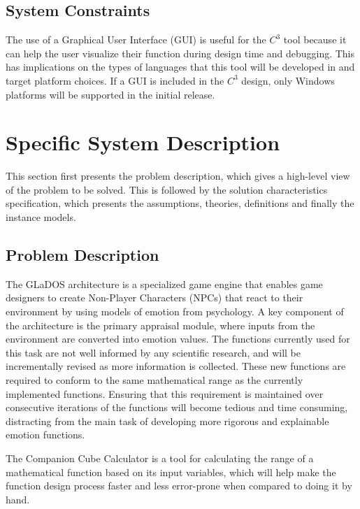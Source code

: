 \documentclass[12pt]{article}
\newcommand{\progname}{Companion Cube Calculator} %
\newcommand{\prognameAbbrv}{$C^{3}$}
\begin{document}
\subsection{System Constraints}
The use of a Graphical User Interface (GUI) is useful for the \prognameAbbrv{} 
tool because it can help the user visualize their function during design time 
and debugging. This has implications on the types of languages that this tool 
will be developed in and target platform choices. If a GUI is included in the 
\prognameAbbrv{} design, only Windows platforms will be supported in the 
initial release.

\section{Specific System Description}
\label{specific}
This section first presents the problem description, which gives a high-level
view of the problem to be solved.  This is followed by the solution 
characteristics specification, which presents the assumptions, theories, 
definitions and finally the instance models.  

\subsection{Problem Description} \label{Sec_pd}
The GLaDOS architecture is a specialized game engine that enables game 
designers to create Non-Player Characters (NPCs) that react to their 
environment by using models of emotion from psychology. A key component of the 
architecture is the primary appraisal module, where inputs from the environment 
are converted into emotion values. The functions currently used for this task 
are not well informed by any scientific research, and will be incrementally 
revised as more information is collected. These new functions are required to 
conform to the same mathematical range as the currently implemented functions. 
Ensuring that this requirement is maintained over consecutive iterations of the 
functions will become tedious and time consuming, distracting from the main 
task of developing more rigorous and explainable emotion functions.

The \progname{} is a tool for calculating the range of a mathematical function 
based on its input variables, which will help make the function design process 
faster and less error-prone when compared to doing it by hand.
\end{document}

